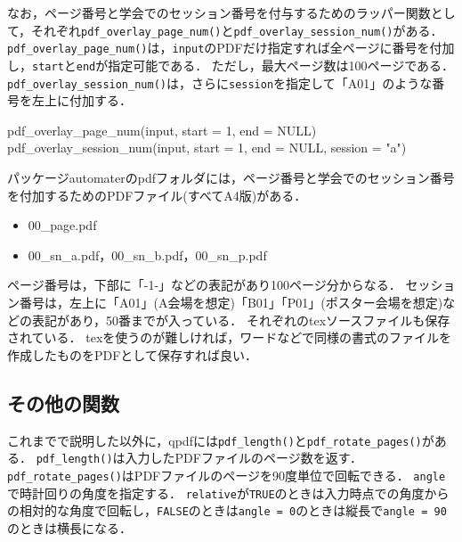 \documentclass[
]{article}
\newenvironment{Shaded}{\begin{snugshade}}{\end{snugshade}}
\newcommand{\AttributeTok}[1]{\textcolor[rgb]{0.77,0.63,0.00}{#1}}
\newcommand{\ConstantTok}[1]{\textcolor[rgb]{0.00,0.00,0.00}{#1}}
\newcommand{\DecValTok}[1]{\textcolor[rgb]{0.00,0.00,0.81}{#1}}
\newcommand{\FunctionTok}[1]{\textcolor[rgb]{0.00,0.00,0.00}{#1}}
\newcommand{\NormalTok}[1]{#1}
\newcommand{\StringTok}[1]{\textcolor[rgb]{0.31,0.60,0.02}{#1}}
\providecommand{\tightlist}{%
  \setlength{\itemsep}{0pt}\setlength{\parskip}{0pt}}
\begin{document}
なお，ページ番号と学会でのセッション番号を付与するためのラッパー関数として，それぞれ\texttt{pdf\_overlay\_page\_num()}と\texttt{pdf\_overlay\_session\_num()}がある．
\texttt{pdf\_overlay\_page\_num()}は，\texttt{input}のPDFだけ指定すれば全ページに番号を付加し，\texttt{start}と\texttt{end}が指定可能である．
ただし，最大ページ数は100ページである．
\texttt{pdf\_overlay\_session\_num()}は，さらに\texttt{session}を指定して「A01」のような番号を左上に付加する．

\begin{Shaded}
\begin{Highlighting}[]
\FunctionTok{pdf\_overlay\_page\_num}\NormalTok{(input, }\AttributeTok{start =} \DecValTok{1}\NormalTok{, }\AttributeTok{end =} \ConstantTok{NULL}\NormalTok{)}
\FunctionTok{pdf\_overlay\_session\_num}\NormalTok{(input, }\AttributeTok{start =} \DecValTok{1}\NormalTok{, }\AttributeTok{end =} \ConstantTok{NULL}\NormalTok{, }\AttributeTok{session =} \StringTok{"a"}\NormalTok{)}
\end{Highlighting}
\end{Shaded}

パッケージautomaterのpdfフォルダには，ページ番号と学会でのセッション番号を付加するためのPDFファイル(すべてA4版)がある．

\begin{itemize}
\tightlist
\item
  00\_page.pdf\\
\item
  00\_sn\_a.pdf，00\_sn\_b.pdf，00\_sn\_p.pdf
\end{itemize}

ページ番号は，下部に「-1-」などの表記があり100ページ分からなる．
セッション番号は，左上に「A01」(A会場を想定)「B01」「P01」(ポスター会場を想定)などの表記があり，50番までが入っている．
それぞれのtexソースファイルも保存されている．
texを使うのが難しければ，ワードなどで同様の書式のファイルを作成したものをPDFとして保存すれば良い．

\hypertarget{ux305dux306eux4ed6ux306eux95a2ux6570-1}{%
\subsection{その他の関数}\label{ux305dux306eux4ed6ux306eux95a2ux6570-1}}

これまでで説明した以外に，qpdfには\texttt{pdf\_length()}と\texttt{pdf\_rotate\_pages()}がある．
\texttt{pdf\_length()}は入力したPDFファイルのページ数を返す．
\texttt{pdf\_rotate\_pages()}はPDFファイルのページを90度単位で回転できる．
\texttt{angle}で時計回りの角度を指定する．
\texttt{relative}が\texttt{TRUE}のときは入力時点での角度からの相対的な角度で回転し，\texttt{FALSE}のときは\texttt{angle\ =\ 0}のときは縦長で\texttt{angle\ =\ 90}のときは横長になる．
\end{document}
